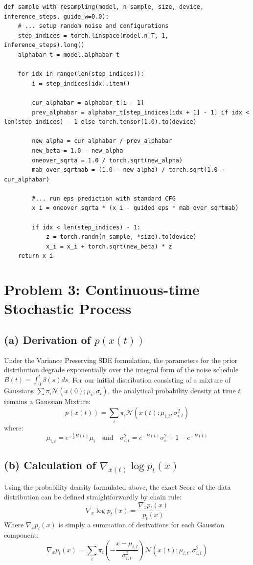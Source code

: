 \documentclass[11pt]{article}
\begin{document}
\begin{lstlisting}[caption={Implementation of \texttt{sample\_with\_resampling()}}]
def sample_with_resampling(model, n_sample, size, device, inference_steps, guide_w=0.0):
    # ... setup random noise and configurations
    step_indices = torch.linspace(model.n_T, 1, inference_steps).long()
    alphabar_t = model.alphabar_t
    
    for idx in range(len(step_indices)):
        i = step_indices[idx].item()
        
        cur_alphabar = alphabar_t[i - 1]
        prev_alphabar = alphabar_t[step_indices[idx + 1] - 1] if idx < len(step_indices) - 1 else torch.tensor(1.0).to(device)
        
        new_alpha = cur_alphabar / prev_alphabar
        new_beta = 1.0 - new_alpha
        oneover_sqrta = 1.0 / torch.sqrt(new_alpha)
        mab_over_sqrtmab = (1.0 - new_alpha) / torch.sqrt(1.0 - cur_alphabar)
        
        #... run eps prediction with standard CFG
        x_i = oneover_sqrta * (x_i - guided_eps * mab_over_sqrtmab)

        if idx < len(step_indices) - 1:
            z = torch.randn(n_sample, *size).to(device)
            x_i = x_i + torch.sqrt(new_beta) * z
    return x_i
\end{lstlisting}

\newpage
\section*{Problem 3: Continuous-time Stochastic Process}

\subsection*{(a) Derivation of $p(x(t))$}
Under the Variance Preserving SDE formulation, the parameters for the prior distribution degrade exponentially over the integral form of the noise schedule $B(t) = \int_0^t \beta(s)ds$. 
For our initial distribution consisting of a mixture of Gaussians $\sum \pi_i \mathcal{N}(x(0); \mu_i, \sigma_i)$, the analytical probability density at time $t$ remains a Gaussian Mixture:
$$ p(x(t)) = \sum_{i} \pi_i \mathcal{N}(x(t); \mu_{i, t}, \sigma^2_{i, t}) $$
where:
$$ \mu_{i, t} = e^{-\frac{1}{2}B(t)}\mu_i \quad \text{and} \quad \sigma^2_{i, t} = e^{-B(t)}\sigma_i^2 + 1 - e^{-B(t)} $$

\subsection*{(b) Calculation of $\nabla_{x(t)} \log p_t(x)$}
Using the probability density formulated above, the exact Score of the data distribution can be defined straightforwardly by chain rule:
$$ \nabla_x \log p_t(x) = \frac{\nabla_x p_t(x)}{p_t(x)} $$
Where $\nabla_x p_t(x)$ is simply a summation of derivations for each Gaussian component:
$$ \nabla_x p_t(x) = \sum_i \pi_i \left( -\frac{x - \mu_{i, t}}{\sigma^2_{i, t}} \right) \mathcal{N}(x(t); \mu_{i, t}, \sigma^2_{i, t}) $$
\end{document}
